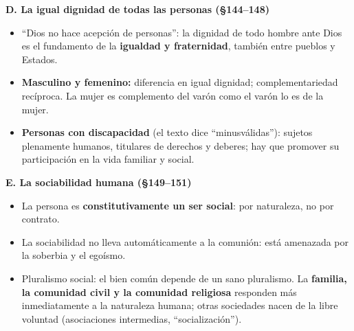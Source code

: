 \documentclass[10pt,a4paper]{article}
\begin{document}
\medskip\noindent \textbf{D. La igual dignidad de todas las personas (\S{}144--148)}\par\nopagebreak
\begin{itemize}
\item ``Dios no hace acepción de personas'': la dignidad de todo hombre ante Dios es el fundamento de la \textbf{igualdad y fraternidad}, también entre pueblos y Estados.
\item \textbf{Masculino y femenino:} diferencia en igual dignidad; complementariedad recíproca. La mujer es complemento del varón como el varón lo es de la mujer.
\item \textbf{Personas con discapacidad} (el texto dice ``minusválidas''): sujetos plenamente humanos, titulares de derechos y deberes; hay que promover su participación en la vida familiar y social.
\end{itemize}

\medskip\noindent \textbf{E. La sociabilidad humana (\S{}149--151)}\par\nopagebreak
\begin{itemize}
\item La persona es \textbf{constitutivamente un ser social}: por naturaleza, no por contrato.
\item La sociabilidad no lleva automáticamente a la comunión: está amenazada por la soberbia y el egoísmo.
\item Pluralismo social: el bien común depende de un sano pluralismo. La \textbf{familia, la comunidad civil y la comunidad religiosa} responden más inmediatamente a la naturaleza humana; otras sociedades nacen de la libre voluntad (asociaciones intermedias, ``socialización'').
\end{itemize}
\end{document}
